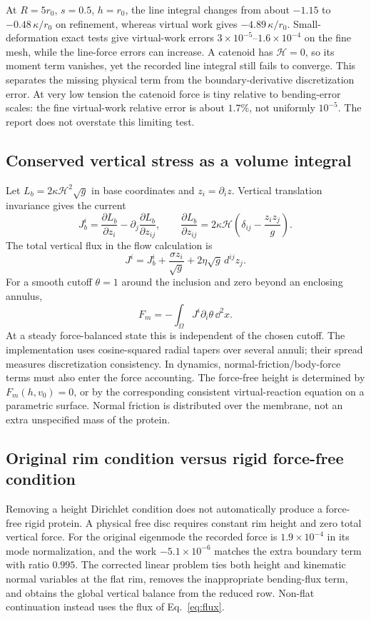At $R=5r_0$, $s=0.5$, $h=r_0$, the line integral changes from about $-1.15$ to $-0.48\,\kappa/r_0$ on refinement, whereas virtual work gives $-4.89\,\kappa/r_0$. Small-deformation exact tests give virtual-work errors $3\times10^{-5}$--$1.6\times10^{-4}$ on the fine mesh, while the line-force errors can increase. A catenoid has $\mathcal H=0$, so its moment term vanishes, yet the recorded line integral still fails to converge. This separates the missing physical term from the boundary-derivative discretization error. At very low tension the catenoid force is tiny relative to bending-error scales: the fine virtual-work relative error is about $1.7\%$, not uniformly $10^{-5}$. The report does not overstate this limiting test.

\subsection{Conserved vertical stress as a volume integral}
Let $L_b=2\kappa\mathcal H^2\sqrt g$ in base coordinates and $z_i=\partial_i z$. Vertical translation invariance gives the current
\begin{equation}
J_b^i=\frac{\partial L_b}{\partial z_i}-\partial_j\frac{\partial L_b}{\partial z_{ij}},\qquad
\frac{\partial L_b}{\partial z_{ij}}=2\kappa\mathcal H\left(\delta_{ij}-\frac{z_i z_j}{g}\right).
\end{equation}
The total vertical flux in the flow calculation is
\begin{equation}
J^i=J_b^i+\frac{\sigma z_i}{\sqrt g}+2\eta\sqrt g\,d^{ij}z_j .
\end{equation}
For a smooth cutoff $\theta=1$ around the inclusion and zero beyond an enclosing annulus,
\begin{equation}
F_m=-\int_\Omega J^i\partial_i\theta\,\dd^2x.\label{eq:flux}
\end{equation}
At a steady force-balanced state this is independent of the chosen cutoff. The implementation uses cosine-squared radial tapers over several annuli; their spread measures discretization consistency. In dynamics, normal-friction/body-force terms must also enter the force accounting. The force-free height is determined by $F_m(h,v_0)=0$, or by the corresponding consistent virtual-reaction equation on a parametric surface. Normal friction is distributed over the membrane, not an extra unspecified mass of the protein.

\subsection{Original rim condition versus rigid force-free condition}
Removing a height Dirichlet condition does not automatically produce a force-free rigid protein. A physical free disc requires constant rim height and zero total vertical force. For the original  eigenmode the recorded force is $1.9\times10^{-4}$ in its mode normalization, and the work $-5.1\times10^{-6}$ matches the extra boundary term with ratio $0.995$. The corrected linear problem ties both height and kinematic normal variables at the flat rim, removes the inappropriate bending-flux term, and obtains the global vertical balance from the reduced row. Non-flat continuation instead uses the flux of Eq.~\eqref{eq:flux}.

